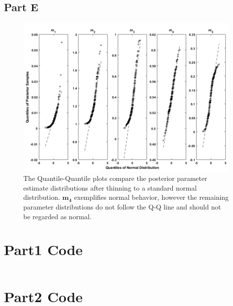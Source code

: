 \documentclass{article}
\begin{document}
\subsection*{Part E}
\begin{figure}[!h]
    \centering
    \includegraphics[width = \textwidth]{2e.png}
    \caption{The Quantile-Quantile plots compare the posterior parameter estimate distributions after thinning to a standard normal distribution. $\mathbf{m_4}$ exemplifies normal behavior, however the remaining parameter distributions do not follow the Q-Q line and should not be regarded as normal. }
    \label{fig:2e}
\end{figure}


\newpage
\section{Part1 Code}
\inputminted[]{python}{"main.py"}
\section{Part2 Code}
\inputminted[]{matlab}{"G11.m"}
\inputminted[]{matlab}{"lognormalprior.m"}
\end{document}

